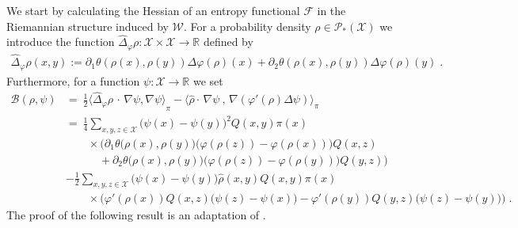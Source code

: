 \documentclass[a4paper,11pt,reqno]{amsart}
\theoremstyle{plain}
\theoremstyle{remark}
\numberwithin{equation}{section}
\begin{document}
We start by calculating the Hessian of an entropy functional ${\mathcal{F}}$ in
the Riemannian structure induced by ${\mathcal{W}}$.  For a probability density
$\rho \in {{\mathscr{P}}_*({\mathcal{X}})}$ we introduce the function ${\hat\Delta}_{\varphi} \rho : {\mathcal{X}}
\times {\mathcal{X}} \to {{\mathbb R}}$ defined by
\begin{align*}
{\hat\Delta}_{\varphi} \rho(x,y) :=  
 \partial_1 \theta(\rho(x), \rho(y)) \Delta {\varphi}(\rho)(x)
  + \partial_2 \theta(\rho(x), \rho(y)) \Delta {\varphi}(\rho)(y)\;.
\end{align*}
Furthermore, for a function $\psi :  {\mathcal{X}} \to {{\mathbb R}}$ we set
\begin{equation}\begin{aligned}\label{eq:B}
 {\mathcal{B}}(\rho, \psi) 
&= \ \frac12
  {\big\langle {{{\hat\Delta}_{\varphi}\rho\, \cdot\, \nabla \psi, \nabla \psi }}\big\rangle}_\pi
    - {\big\langle {{{\hat\rho}  \cdot\,\nabla \psi\ ,\, \nabla ({\varphi}'(\rho)\Delta\psi)}}\big\rangle}_\pi 
\\ & = \ 
  \frac14
       \sum_{x,y,z \in {\mathcal{X}}} 
         \big(\psi(x) - \psi(y)\big)^2 Q(x,y) \pi(x)
         \\ & \qquad \times
        \Big( \partial_1 \theta\big(\rho(x), \rho(y)\big) \big({\varphi}(\rho(z)) - {\varphi}(\rho(x)) \big)Q(x,z)
 \\& \qquad\quad
    + \partial_2 \theta\big(\rho(x), \rho(y)\big) \big({\varphi}(\rho(z)) - {\varphi}(\rho(y)) \big)Q(y,z)\Big)
  \\ &  - 
   \frac12
       \sum_{x,y,z \in {\mathcal{X}}}
          \big(\psi(x) - \psi(y)\big)
        {\hat\rho}(x,y)Q(x,y)\pi(x)
  \\& \qquad \times  
   \Big( {\varphi}'(\rho(x)) Q(x,z) \big( \psi(z) - \psi(x) \big)
           -   {\varphi}'(\rho(y)) Q(y,z) \big( \psi(z) -\psi(y)  \big) \Big)  \;.
\end{aligned}\end{equation}
The proof of the following result is an adaptation of \cite[Proposition 4.2]{EM11}.
\end{document}
